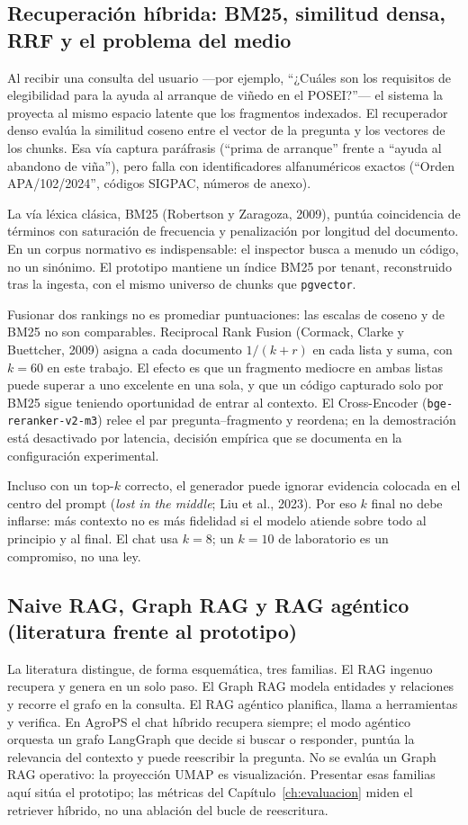 \subsection{Recuperación híbrida: BM25, similitud densa, RRF y el problema del medio}
Al recibir una consulta del usuario ---por ejemplo, ``¿Cuáles son los requisitos de elegibilidad para la ayuda al arranque de viñedo en el POSEI?''--- el sistema la proyecta al mismo espacio latente que los fragmentos indexados. El recuperador denso evalúa la similitud coseno entre el vector de la pregunta y los vectores de los chunks. Esa vía captura paráfrasis (``prima de arranque'' frente a ``ayuda al abandono de viña''), pero falla con identificadores alfanuméricos exactos (``Orden APA/102/2024'', códigos SIGPAC, números de anexo).

La vía léxica clásica, BM25 (Robertson y Zaragoza, 2009), puntúa coincidencia de términos con saturación de frecuencia y penalización por longitud del documento. En un corpus normativo es indispensable: el inspector busca a menudo un código, no un sinónimo. El prototipo mantiene un índice BM25 por tenant, reconstruido tras la ingesta, con el mismo universo de chunks que \texttt{pgvector}.

Fusionar dos rankings no es promediar puntuaciones: las escalas de coseno y de BM25 no son comparables. Reciprocal Rank Fusion (Cormack, Clarke y Buettcher, 2009) asigna a cada documento $1/(k+r)$ en cada lista y suma, con $k=60$ en este trabajo. El efecto es que un fragmento mediocre en ambas listas puede superar a uno excelente en una sola, y que un código capturado solo por BM25 sigue teniendo oportunidad de entrar al contexto. El Cross-Encoder (\texttt{bge-reranker-v2-m3}) relee el par pregunta--fragmento y reordena; en la demostración está desactivado por latencia, decisión empírica que se documenta en la configuración experimental.

Incluso con un top-$k$ correcto, el generador puede ignorar evidencia colocada en el centro del prompt (\emph{lost in the middle}; Liu et al., 2023). Por eso $k$ final no debe inflarse: más contexto no es más fidelidad si el modelo atiende sobre todo al principio y al final. El chat usa $k=8$; un $k=10$ de laboratorio es un compromiso, no una ley.

\subsection{Naive RAG, Graph RAG y RAG agéntico (literatura frente al prototipo)}
La literatura distingue, de forma esquemática, tres familias. El RAG ingenuo recupera y genera en un solo paso. El Graph RAG modela entidades y relaciones y recorre el grafo en la consulta. El RAG agéntico planifica, llama a herramientas y verifica. En AgroPS el chat híbrido recupera siempre; el modo agéntico orquesta un grafo LangGraph que decide si buscar o responder, puntúa la relevancia del contexto y puede reescribir la pregunta. No se evalúa un Graph RAG operativo: la proyección UMAP es visualización. Presentar esas familias aquí sitúa el prototipo; las métricas del Capítulo~\ref{ch:evaluacion} miden el retriever híbrido, no una ablación del bucle de reescritura.

